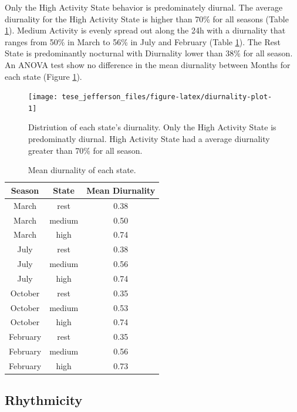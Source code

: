 \documentclass[english,msc,numbers,hidelinks]{coppe}
\begin{document}
  Only the High Activity State behavior is predominately diurnal. The average diurnality for the High Activity State is higher than 70\% for all seasons (Table \ref{tab:table-mean-time-in-state}). Medium Activity is evenly spread out along the 24h with a diurnality that ranges from 50\% in March to 56\% in July and February (Table \ref{tab:table-mean-time-in-state}). The Rest State is predominantly nocturnal with Diurnality lower than 38\% for all season. An ANOVA test show no difference in the mean diurnality between Months for each state (Figure \ref{fig:diurnality-plot}).
  \begin{figure}[H]

  {\centering \texttt{[image: tese\_jefferson\_files/figure-latex/diurnality-plot-1]} 

  }

  \caption{Distriution of each state's diurnality. Only the High Activity State is predominatly diurnal. High Activity State had a average diurnality greater than 70\% for all season.}\label{fig:diurnality-plot}
  \end{figure}
  \begin{table}[!h]

  \caption{\label{tab:table-mean-time-in-state}Mean diurnality of each state.}
  \centering
  \begin{tabular}[t]{ccc}
  \toprule
  Season & State & Mean Diurnality\\
  \midrule
  March & rest & 0.38\\
  March & medium & 0.50\\
  March & high & 0.74\\
  July & rest & 0.38\\
  July & medium & 0.56\\
  \addlinespace
  July & high & 0.74\\
  October & rest & 0.35\\
  October & medium & 0.53\\
  October & high & 0.74\\
  February & rest & 0.35\\
  \addlinespace
  February & medium & 0.56\\
  February & high & 0.73\\
  \bottomrule
  \end{tabular}
  \end{table}
  \hypertarget{rhythmicity-1}{%
  \subsection{Rhythmicity}\label{rhythmicity-1}}
\end{document}
